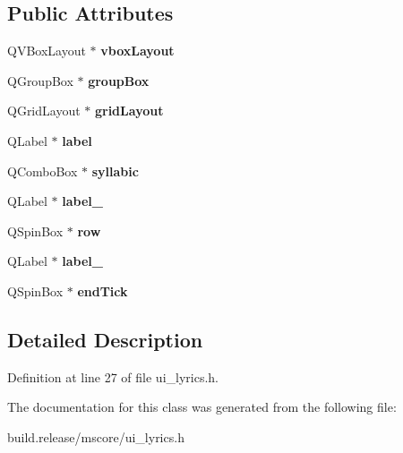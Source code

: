 \subsection*{Public Attributes}
\begin{DoxyCompactItemize}
\item 
\mbox{\label{class_ui___lyrics_base_ae61365052c6f63f7068afa7fb6b3d229}} 
Q\+V\+Box\+Layout $\ast$ {\bfseries vbox\+Layout}
\item 
\mbox{\label{class_ui___lyrics_base_a57d3617863844fbaebaa1b214166163a}} 
Q\+Group\+Box $\ast$ {\bfseries group\+Box}
\item 
\mbox{\label{class_ui___lyrics_base_a8b8346fc604752c7e248c27d6a237ebb}} 
Q\+Grid\+Layout $\ast$ {\bfseries grid\+Layout}
\item 
\mbox{\label{class_ui___lyrics_base_a70fbbd412084bda7b81c1f892cfbf685}} 
Q\+Label $\ast$ {\bfseries label}
\item 
\mbox{\label{class_ui___lyrics_base_a28f52dc0964a811f689d66489451c276}} 
Q\+Combo\+Box $\ast$ {\bfseries syllabic}
\item 
\mbox{\label{class_ui___lyrics_base_ac876bc19a8cb94755019723dbb62e493}} 
Q\+Label $\ast$ {\bfseries label\+\_}
\item 
\mbox{\label{class_ui___lyrics_base_ad448a56321cc54fdf1b9989825293135}} 
Q\+Spin\+Box $\ast$ {\bfseries row}
\item 
\mbox{\label{class_ui___lyrics_base_a2194957e4c22ddb18459c36210d0672a}} 
Q\+Label $\ast$ {\bfseries label\+\_}
\item 
\mbox{\label{class_ui___lyrics_base_a6ebee01febdb774bce83c178bc02aeab}} 
Q\+Spin\+Box $\ast$ {\bfseries end\+Tick}
\end{DoxyCompactItemize}


\subsection{Detailed Description}


Definition at line 27 of file ui\+\_\+lyrics.\+h.



The documentation for this class was generated from the following file\+:\begin{DoxyCompactItemize}
\item 
build.\+release/mscore/ui\+\_\+lyrics.\+h\end{DoxyCompactItemize}
